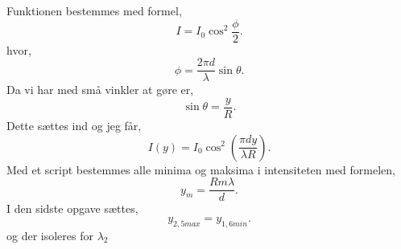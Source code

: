 \begin{solution}
Funktionen bestemmes med formel,
\[
I = I_0 \cos ^2 \frac{\phi}{2}
.\]
hvor,
\[
\phi = \frac{2\pi d}{\lambda}\sin \theta 
.\]
Da vi har med små vinkler at gøre er,
\[
\sin \theta = \frac{y}{R} 
.\]
Dette sættes ind og jeg får,
\[
I\left( y \right)  = I_0 \cos ^2 \left( \frac{\pi d y}{\lambda R} \right) 
.\]
Med et script bestemmes alle minima og maksima i intensiteten med formelen,
\[
y_m = \frac{Rm \lambda}{d}
.\]
I den sidste opgave sættes,
\[
y_{2,5max} = y_{1,6min}
.\] 
og der isoleres for $\lambda_2$
\end{solution}

